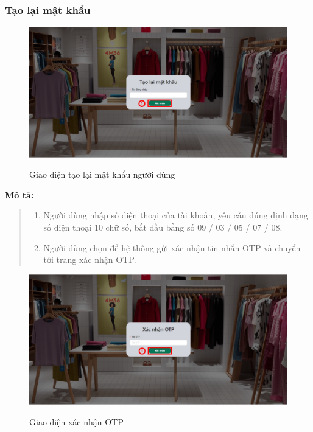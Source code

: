 \subsubsection{Tạo lại mật khẩu}
\begin{figure}[!htp]
    \centering
    \includegraphics[width=5in]{img/UI/new_customer/reset_password.png}
    \label{3}
    \newline
    \caption{Giao diện tạo lại mật khẩu người dùng}
\end{figure}
\textbf{Mô tả:}
\begin{quote}
    \begin{enumerate}
        \item Người dùng nhập số điện thoại của tài khoản, yêu cầu đúng định dạng số điện thoại 10 chữ số, bắt đầu bằng số 09 / 03 / 05 / 07 / 08.
        \item Người dùng chọn để hệ thống gửi xác nhận tin nhắn OTP và chuyển tới trang xác nhận OTP.
    \end{enumerate}
\end{quote}
\newpage
\begin{figure}[!htp]
    \centering
    \includegraphics[width=5in]{img/UI/new_customer/confirm_otp.png}
    \label{4}
    \newline
    \caption{Giao diện xác nhận OTP}
\end{figure}
